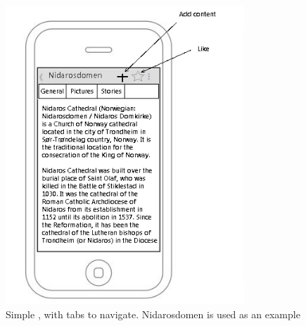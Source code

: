 \documentclass[11pt]{book}
\begin{document}
\begin{figure}[H]
    \centering
    \includegraphics[width=0.8\textwidth]{Figures/Phases/Sprint1/versiononeSimpleWall.png}
    \caption{Simple \wallentitys, with tabs to navigate. Nidarosdomen is used as an example}
    \label{fig:phases_sprint1_uiVersionOneSimpleWall}
\end{figure}
\end{document}
